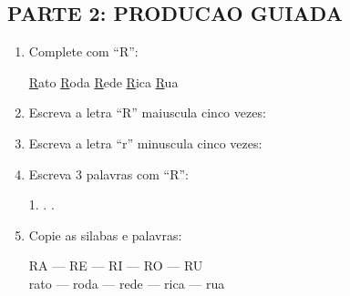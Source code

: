 \begin{exercicio}
\subsection*{PARTE 2: PRODUCAO GUIADA}

\begin{enumerate}[resume]
  \item Complete com ``R'':
  \begin{center}
  \underline{R}ato \quad \underline{R}oda \quad \underline{R}ede \quad \underline{R}ica \quad \underline{R}ua
  \end{center}

  \item Escreva a letra ``R'' maiuscula cinco vezes:
  \begin{center}
  \underline{\hspace{1.5cm}} \quad \underline{\hspace{1.5cm}} \quad \underline{\hspace{1.5cm}} \quad \underline{\hspace{1.5cm}} \quad \underline{\hspace{1.5cm}}
  \end{center}

  \item Escreva a letra ``r'' minuscula cinco vezes:
  \begin{center}
  \underline{\hspace{1.5cm}} \quad \underline{\hspace{1.5cm}} \quad \underline{\hspace{1.5cm}} \quad \underline{\hspace{1.5cm}} \quad \underline{\hspace{1.5cm}}
  \end{center}

  \item Escreva 3 palavras com ``R'':
  \begin{center}
  1. \underline{\hspace{4cm}} . \underline{\hspace{4cm}} . \underline{\hspace{4cm}}
  \end{center}

  \item Copie as silabas e palavras:
  \begin{center}
  RA --- RE --- RI --- RO --- RU\\
  rato --- roda --- rede --- rica --- rua
  \end{center}
\end{enumerate}


\end{exercicio}
